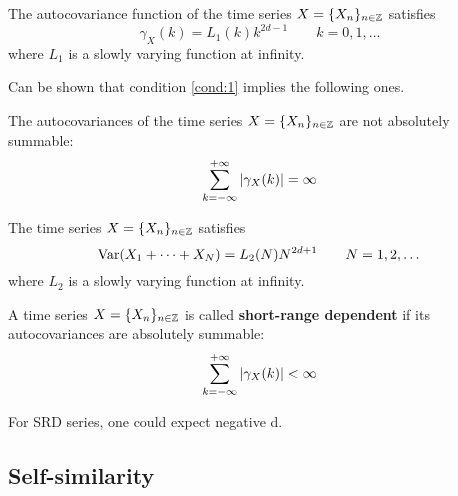 \begin{condition}\label{cond:1}
	The autocovariance function of the time series $X = \{ X_n \}_{n \in \mathbb{Z}}$ satisfies
	\begin{equation}
		\gamma_X(k) = L_1(k) k^{2d -1} \qquad k=0,1,\dots
	\end{equation}
	where $L_1$ is a slowly varying function at infinity.
\end{condition}

Can be shown that condition \autoref{cond:1} implies the following ones.\\ 
\begin{condition}\label{cond:2}
	The autocovariances of the time series $X = \{ X_n \}_{n \in \mathbb{Z}}$ are not absolutely summable:
	\begin{equation}
		\sum_{k=-\infty}^{+\infty} \abs{\gamma_X(k)} = \infty
	\end{equation}
\end{condition}

\begin{condition}\label{cond:3}
	The time series $X = \{ X_n \}_{n \in \mathbb{Z}}$ satisfies
	\begin{equation}
		\textnormal{Var}(X_1 + \dots + X_N) = L_2(N) N^{2d + 1} \qquad N = 1, 2, \dots
	\end{equation}
	where $L_2$ is a slowly varying function at infinity.
\end{condition}

\begin{definition}
	A time series $X = \{ X_n \}_{n \in \mathbb{Z}}$ is called \textbf{short-range
	dependent} if its autocovariances are absolutely summable:
	\begin{equation}
		\sum_{k=-\infty}^{+\infty} \abs{\gamma_X(k)} < \infty
	\end{equation}
\end{definition}
For SRD series, one could expect negative d. 

\subsection{Self-similarity}

